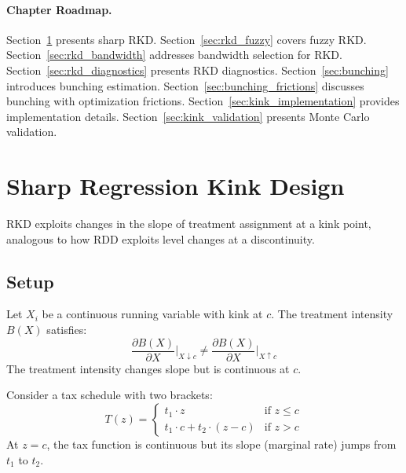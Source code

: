 \paragraph{Chapter Roadmap.}
Section~\ref{sec:rkd_sharp} presents sharp RKD. Section~\ref{sec:rkd_fuzzy} covers fuzzy RKD. Section~\ref{sec:rkd_bandwidth} addresses bandwidth selection for RKD. Section~\ref{sec:rkd_diagnostics} presents RKD diagnostics. Section~\ref{sec:bunching} introduces bunching estimation. Section~\ref{sec:bunching_frictions} discusses bunching with optimization frictions. Section~\ref{sec:kink_implementation} provides implementation details. Section~\ref{sec:kink_validation} presents Monte Carlo validation.

\section{Sharp Regression Kink Design}
\label{sec:rkd_sharp}

RKD exploits changes in the slope of treatment assignment at a kink point, analogous to how RDD exploits level changes at a discontinuity.

\subsection{Setup}

\begin{definition}
\label{def:sharp_rkd}
Let $X_i$ be a continuous running variable with kink at $c$. The treatment intensity $B(X)$ satisfies:
\begin{equation}
    \frac{\partial B(X)}{\partial X}\bigg|_{X \downarrow c} \neq \frac{\partial B(X)}{\partial X}\bigg|_{X \uparrow c}
\end{equation}
The treatment intensity changes slope but is continuous at $c$.
\end{definition}

\begin{example}
Consider a tax schedule with two brackets:
\begin{equation}
    T(z) = \begin{cases}
        t_1 \cdot z & \text{if } z \leq c \\
        t_1 \cdot c + t_2 \cdot (z - c) & \text{if } z > c
    \end{cases}
\end{equation}
At $z = c$, the tax function is continuous but its slope (marginal rate) jumps from $t_1$ to $t_2$.
\end{example}

